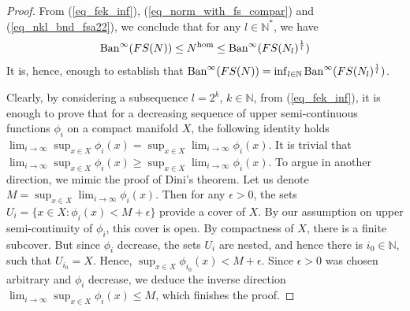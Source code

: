 \documentclass[12pt]{article}
\numberwithin{equation}{section}
\theoremstyle{theorem}
\theoremstyle{definition}
\theoremstyle{remark}
\newcommand{\nat}{\mathbb{N}}
\begin{document}
	\begin{proof}
		From (\ref{eq_fek_inf}), (\ref{eq_norm_with_fs_compar}) and (\ref{eq_nkl_bnd_fsa22}), we conclude that for any $l \in \nat^*$, we have
		\begin{equation}
			{\rm{Ban}}^{\infty}(FS(N)) \leq N^{{\rm{hom}}} \leq {\rm{Ban}}^{\infty}(FS(N_l)^{\frac{1}{l}})
		\end{equation}
		It is, hence, enough to establish that $
			{\rm{Ban}}^{\infty}(FS(N)) = \inf_{l \in \nat} {\rm{Ban}}^{\infty}(FS(N_l)^{\frac{1}{l}})
		$.
		\par 
		Clearly, by considering a subsequence $l = 2^k$, $k \in \nat$, from (\ref{eq_fek_inf}), it is enough to prove that for a decreasing sequence of upper semi-continuous functions $\phi_i$ on a compact manifold $X$, the following identity holds
		$
			\lim_{i \to \infty} \sup_{x \in X} \phi_i(x)
			=
			\sup_{x \in X} \lim_{i \to \infty} \phi_i(x)
		$.
		It is trivial that $\lim_{i \to \infty} \sup_{x \in X} \phi_i(x) \geq \sup_{x \in X} \lim_{i \to \infty} \phi_i(x)$.
		To argue in another direction, we mimic the proof of Dini's theorem.
		Let us denote $M = \sup_{x \in X} \lim_{i \to \infty} \phi_i(x)$. 
		Then for any $\epsilon > 0$, the sets $U_i = \{ x \in X : \phi_i(x) < M + \epsilon \}$ provide a cover of $X$.
		By our assumption on upper semi-continuity of $\phi_i$, this cover is open.
		By compactness of $X$, there is a finite subcover.
		But since $\phi_i$ decrease, the sets $U_i$ are nested, and hence there is $i_0 \in \nat$, such that $U_{i_0} = X$. 
		Hence, $\sup_{x \in X} \phi_{i_0}(x) < M + \epsilon$.
		Since $\epsilon > 0$ was chosen arbitrary and $\phi_i$ decrease, we deduce the inverse direction  $\lim_{i \to \infty} \sup_{x \in X} \phi_i(x) \leq M$, which finishes the proof.
	\end{proof}
\end{document}
